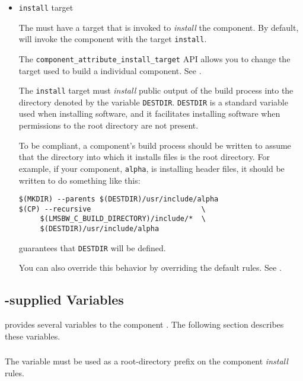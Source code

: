 \begin{itemize}
\item \texttt{install} target

  The \makefile must have a target that is invoked to \emph{install}
  the component.  By default, \lmsbw will invoke the component
  \makefile with the target \texttt{install}.

  The \texttt{component\_attribute\_install\_target} API allows you to
  change the target used to build a individual component.  See
  .

  The \texttt{install} target must \emph{install} public output of the
  build process into the directory denoted by the \makefile variable
  \texttt{DESTDIR}.  \texttt{DESTDIR} is a standard \make variable
  used when installing software, and it facilitates installing
  software when permissions to the root directory are not present.

  To be compliant, a component's build process should be written to
  assume that the directory into which it installs files is the root
  directory.  For example, if your component, \texttt{alpha}, is
  installing header files, it should be written to do something like
  this:

\begin{verbatim}
$(MKDIR) --parents $(DESTDIR)/usr/include/alpha
$(CP) --recursive                          \
     $(LMSBW_C_BUILD_DIRECTORY)/include/*  \
     $(DESTDIR)/usr/include/alpha
\end{verbatim}

  \lmsbw guarantees that \texttt{DESTDIR} will be defined.

  You can also override this behavior by overriding the default rules.
  See .

\end{itemize}

\subsection{\lmsbw-supplied Variables}

\lmsbw provides several variables to the component \makefile.  The
following section describes these variables.

\subsubsection{\destdir}

The \destdir variable must be used as a root-directory prefix on the
component \emph{install} rules.

